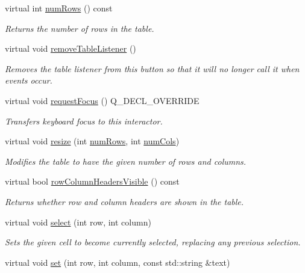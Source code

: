 \begin{DoxyCompactItemize}
virtual int \mbox{\hyperlink{classGTable_a00b7e69dd5c43e42cc91db26c459ad8b}{num\+Rows}} () const
\begin{DoxyCompactList}\small\item\em Returns the number of rows in the table. \end{DoxyCompactList}\item 
virtual void \mbox{\hyperlink{classGTable_aed391150e258bc6c2962f10b810681c9}{remove\+Table\+Listener}} ()
\begin{DoxyCompactList}\small\item\em Removes the table listener from this button so that it will no longer call it when events occur. \end{DoxyCompactList}\item 
virtual void \mbox{\hyperlink{classGTable_a49b39e0eeaf5af829e8956e9055c5cdc}{request\+Focus}} () Q\+\_\+\+D\+E\+C\+L\+\_\+\+O\+V\+E\+R\+R\+I\+DE
\begin{DoxyCompactList}\small\item\em Transfers keyboard focus to this interactor. \end{DoxyCompactList}\item 
virtual void \mbox{\hyperlink{classGTable_a600810b1a74ec9a062ce38666a9e7602}{resize}} (int \mbox{\hyperlink{classGTable_a00b7e69dd5c43e42cc91db26c459ad8b}{num\+Rows}}, int \mbox{\hyperlink{classGTable_a5997e103e56aae1db12e1f7f02e136c5}{num\+Cols}})
\begin{DoxyCompactList}\small\item\em Modifies the table to have the given number of rows and columns. \end{DoxyCompactList}\item 
virtual bool \mbox{\hyperlink{classGTable_a92c3dff0296ec16823a1172a9f9f07e6}{row\+Column\+Headers\+Visible}} () const
\begin{DoxyCompactList}\small\item\em Returns whether row and column headers are shown in the table. \end{DoxyCompactList}\item 
virtual void \mbox{\hyperlink{classGTable_ab06a36d6ed149c8477a1a9d32be2ba43}{select}} (int row, int column)
\begin{DoxyCompactList}\small\item\em Sets the given cell to become currently selected, replacing any previous selection. \end{DoxyCompactList}\item 
virtual void \mbox{\hyperlink{classGTable_ad1a09eece3a11ef4d2c56a951ae06a69}{set}} (int row, int column, const std\+::string \&text)

\end{DoxyCompactItemize}
